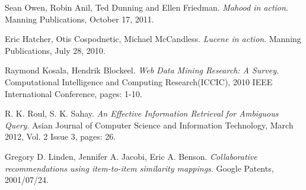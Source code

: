 \begin{thebibliography}{99}
		Sean Owen, Robin Anil, Ted Dunning and Ellen Friedman.
		\emph{Mahood in action}.
		Manning Publications,
		October 17, 2011.


		Eric Hatcher, Otis Cospodnetic, Michael McCandless.
		\emph{Lucene in action}.
		Manning Publications,
		July 28, 2010.


		Raymond Kosala, Hendrik Blockeel.
		\emph{Web Data Mining Research: A Survey}.
		Computational Intelligence and Computing Research(ICCIC),
		2010 IEEE International Conference,
		pages: 1-10.

		R. K. Roul, S. K. Sahay.
		\emph{An Effective Information Retrieval for Ambiguous Query}.
		Asian Journal of Computer Science and Information Technology,
		March 2012,
		Vol. 2 Issue 3, 
		pages: 26.

		Gregory D. Linden, Jennifer A. Jacobi, Eric A. Benson.
		\emph{Collaborative recommendations using item-to-item similarity mappings}.
		Google Patents,
		2001/07/24.

		\end{thebibliography}


